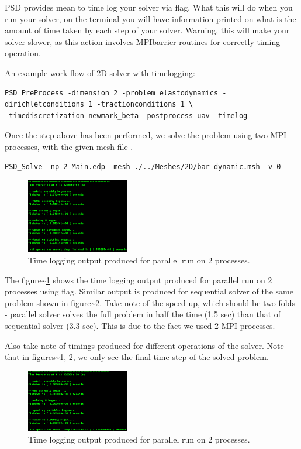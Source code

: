\newcommand{\psd}[1]{{\small\sffamily{\color{blue!60}#1}}}


PSD provides mean to time log your solver via \psd{-timelog} flag. What
this will do when you run your solver, on the terminal you will have
information printed on what is the amount of time taken by each step of
your solver. Warning, this will make your solver slower, as this action
involves MPIbarrier routines for correctly timing operation.

An example work flow of 2D solver with timelogging:

\begin{lstlisting}[style=BashInputStyle]
PSD_PreProcess -dimension 2 -problem elastodynamics -dirichletconditions 1 -tractionconditions 1 \
-timediscretization newmark_beta -postprocess uav -timelog
\end{lstlisting}

Once the step above has been performed, we solve the problem using two
MPI processes, with the given mesh file \psd{bar-dynamic.msh}.

\begin{lstlisting}[style=BashInputStyle]
PSD_Solve -np 2 Main.edp -mesh ./../Meshes/2D/bar-dynamic.msh -v 0
\end{lstlisting}

\begin{figure}[h!]
\centering
\includegraphics[width=0.4\textwidth]{./Images/ed-time-par.png}
\caption{Time logging output produced for parallel run on 2 processes.\label{time-par-ed}}
\end{figure}

The figure\textasciitilde{}\ref{time-par-ed} shows the time logging
output produced for parallel run on 2 processes using \psd{-timelog}
flag. Similar output is produced for sequential solver of the same
problem shown in figure\textasciitilde{}\ref{time-seq-ed}. Take note of
the speed up, which should be two folds - parallel solver solves the
full problem in half the time (1.5 sec) than that of sequential solver
(3.3 sec). This is due to the fact we used 2 MPI processes.

Also take note of timings produced for different operations of the
solver. Note that in figures\textasciitilde{}\ref{time-par-ed},
\ref{time-seq-ed}, we only see the final time step of the solved
problem.

\begin{figure}[h!]
\centering
\includegraphics[width=0.4\textwidth]{./Images/ed-time-seq.png}
\caption{Time logging output produced for parallel run on 2 processes.\label{time-seq-ed}}
\end{figure}
